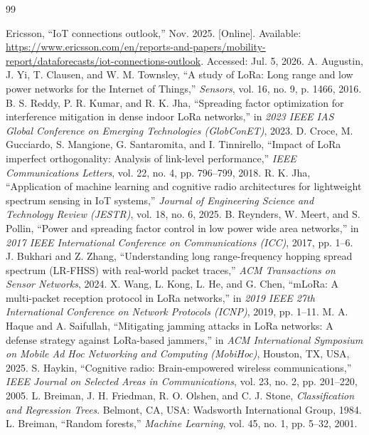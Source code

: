 \documentclass[10pt,a4paper]{article}
\begin{document}
\begin{thebibliography}{99}
\fontsize{10}{12}\selectfont

 Ericsson, “IoT connections outlook,” Nov. 2025. [Online]. Available: \url{https://www.ericsson.com/en/reports-and-papers/mobility-report/dataforecasts/iot-connections-outlook}. Accessed: Jul. 5, 2026.
 A. Augustin, J. Yi, T. Clausen, and W. M. Townsley, “A study of LoRa: Long range and low power networks for the Internet of Things,” \textit{Sensors}, vol. 16, no. 9, p. 1466, 2016.
 B. S. Reddy, P. R. Kumar, and R. K. Jha, “Spreading factor optimization for interference mitigation in dense indoor LoRa networks,” in \textit{2023 IEEE IAS Global Conference on Emerging Technologies (GlobConET)}, 2023.
 D. Croce, M. Gucciardo, S. Mangione, G. Santaromita, and I. Tinnirello, “Impact of LoRa imperfect orthogonality: Analysis of link-level performance,” \textit{IEEE Communications Letters}, vol. 22, no. 4, pp. 796--799, 2018.
 R. K. Jha, “Application of machine learning and cognitive radio architectures for lightweight spectrum sensing in IoT systems,” \textit{Journal of Engineering Science and Technology Review (JESTR)}, vol. 18, no. 6, 2025.
 B. Reynders, W. Meert, and S. Pollin, “Power and spreading factor control in low power wide area networks,” in \textit{2017 IEEE International Conference on Communications (ICC)}, 2017, pp. 1--6.
 J. Bukhari and Z. Zhang, “Understanding long range-frequency hopping spread spectrum (LR-FHSS) with real-world packet traces,” \textit{ACM Transactions on Sensor Networks}, 2024.
 X. Wang, L. Kong, L. He, and G. Chen, “mLoRa: A multi-packet reception protocol in LoRa networks,” in \textit{2019 IEEE 27th International Conference on Network Protocols (ICNP)}, 2019, pp. 1--11.
 M. A. Haque and A. Saifullah, “Mitigating jamming attacks in LoRa networks: A defense strategy against LoRa-based jammers,” in \textit{ACM International Symposium on Mobile Ad Hoc Networking and Computing (MobiHoc)}, Houston, TX, USA, 2025.
 S. Haykin, “Cognitive radio: Brain-empowered wireless communications,” \textit{IEEE Journal on Selected Areas in Communications}, vol. 23, no. 2, pp. 201--220, 2005.
 L. Breiman, J. H. Friedman, R. O. Olshen, and C. J. Stone, \textit{Classification and Regression Trees}. Belmont, CA, USA: Wadsworth International Group, 1984.
 L. Breiman, “Random forests,” \textit{Machine Learning}, vol. 45, no. 1, pp. 5--32, 2001.

\end{thebibliography}
\end{document}
